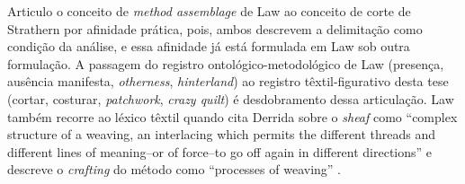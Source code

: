 {Articulo o conceito de \textit{method assemblage} de Law ao conceito de corte de Strathern por afinidade prática, pois, ambos descrevem a delimitação como condição da análise, e essa afinidade já está formulada em Law sob outra formulação. A passagem do registro ontológico-metodológico de Law (presença, ausência manifesta, \textit{otherness}, \textit{hinterland}) ao registro têxtil-figurativo desta tese (cortar, costurar, \textit{patchwork}, \textit{crazy quilt}) é desdobramento dessa articulação. Law também recorre ao léxico têxtil quando cita Derrida sobre o \textit{sheaf} como \enquote{complex structure of a weaving, an interlacing which permits the different threads and different lines of meaning--or of force--to go off again in different directions} \parencite[p.~41]{Law2004After} e descreve o \textit{crafting} do método como \enquote{processes of weaving} \parencite[pp.~144--145, 155]{Law2004After}.}

